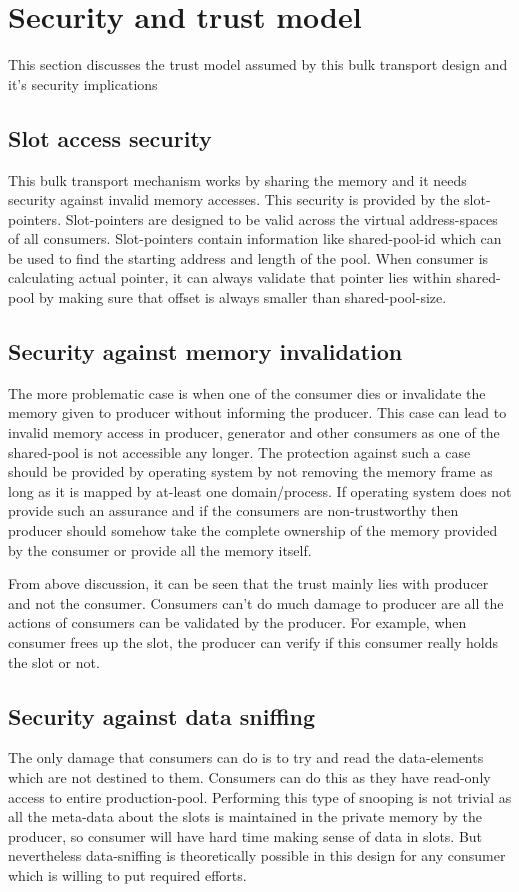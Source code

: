 \documentclass[a4paper,twoside]{report} %
\begin{document}
\section{Security and trust model}
\label{sec:security-trust}
This section discusses the trust model assumed by this bulk transport
design and it's security implications

\subsection{Slot access security}
\label{sec:slot-security}
This bulk transport mechanism works by sharing the memory and it 
needs security against invalid memory accesses.  This security is
provided by the slot-pointers.  Slot-pointers are designed to be valid
across the virtual address-spaces of all consumers.  Slot-pointers
contain information like shared-pool-id which can be used to find the
starting address and length of the pool.  When consumer is calculating
actual pointer, it can always validate that pointer lies within
shared-pool by making sure that offset is always smaller than
shared-pool-size.

\subsection{Security against memory invalidation}
\label{sec:memory-security}
The more problematic case is when one of the consumer dies or
invalidate the memory given to producer without informing the
producer.  This case can lead to invalid memory access in producer,
generator and other consumers as one of the shared-pool is not
accessible any longer.  The protection against such a case
should be provided by operating system by not removing the memory
frame as long as it is mapped by at-least one domain/process.  If
operating system does not provide such an assurance and if the
consumers are non-trustworthy then producer should somehow take the
complete ownership of the memory provided by the consumer or provide
all the memory itself. 


From above discussion, it can be seen that the trust mainly lies with
producer and not the consumer.  Consumers can't do much damage to
producer are all the actions of consumers can be validated by the
producer.  For example, when consumer frees up the slot, the producer
can verify if this consumer really holds the slot or not.


\subsection{Security against data sniffing}
\label{sec:security-sniffing}
The only damage that consumers can do is to try and read the
data-elements which are not destined to them.  Consumers can do this
as they have read-only access to entire production-pool.  Performing
this type of snooping is not trivial as all the meta-data about the
slots is maintained in the private memory by the producer, so consumer
will have hard time making sense of data in slots.  But nevertheless
data-sniffing is theoretically possible in this design for any
consumer which is willing to put required efforts.
\end{document}
